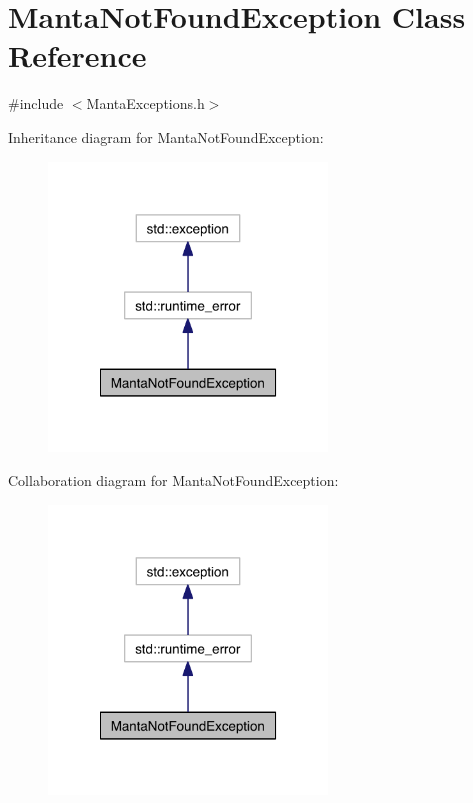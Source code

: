 \hypertarget{classMantaNotFoundException}{\section{\-Manta\-Not\-Found\-Exception \-Class \-Reference}
\label{classMantaNotFoundException}
}


{\ttfamily \#include $<$\-Manta\-Exceptions.\-h$>$}



\-Inheritance diagram for \-Manta\-Not\-Found\-Exception\-:\nopagebreak
\begin{figure}[H]
\begin{center}
\leavevmode
\includegraphics[width=210pt]{classMantaNotFoundException__inherit__graph}
\end{center}
\end{figure}


\-Collaboration diagram for \-Manta\-Not\-Found\-Exception\-:\nopagebreak
\begin{figure}[H]
\begin{center}
\leavevmode
\includegraphics[width=210pt]{classMantaNotFoundException__coll__graph}
\end{center}
\end{figure}
